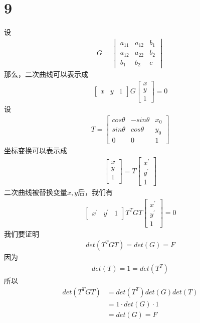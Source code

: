 \documentclass{article}
\begin{document}
\section*{9}

设
\begin{align*}
  G = \begin{vmatrix}
        a_{11} & a_{12} & b_1 \\
        a_{12} & a_{22} & b_2 \\
        b_1    & b_2    & c
      \end{vmatrix}
\end{align*}
那么，二次曲线可以表示成
\begin{align*}
  \begin{bmatrix}
    x & y & 1
  \end{bmatrix}
  G
  \begin{bmatrix}
    x \\
    y \\
    1
  \end{bmatrix}
  = 0
\end{align*}
设
\begin{align*}
  T = \begin{bmatrix}
        cos\theta & -sin\theta & x_0 \\
        sin\theta & cos\theta  & y_0 \\
        0         & 0          & 1
      \end{bmatrix}
\end{align*}
坐标变换可以表示成
\begin{align*}
  \begin{bmatrix}
    x \\
    y \\
    1 \\
  \end{bmatrix}
  = T \begin{bmatrix}
        x^\prime \\
        y^\prime \\
        1
      \end{bmatrix}
\end{align*}
二次曲线被替换变量$x, y$后，我们有
\begin{align*}
  \begin{bmatrix}
    x^\prime & y^\prime & 1
  \end{bmatrix}
  T^T G T \begin{bmatrix}
            x^\prime \\
            y^\prime \\
            1
          \end{bmatrix}
  = 0
\end{align*}
我们要证明
\begin{align*}
  det(T^T G T) = det(G) = F
\end{align*}
因为
\begin{align*}
  det(T) = 1 = det(T^T)
\end{align*}
所以
\begin{align*}
  det(T^T G T)
   & = det(T^T) det(G) det(T) \\
   & = 1 \cdot det(G) \cdot 1 \\
   & = det(G) = F
\end{align*}
\end{document}
